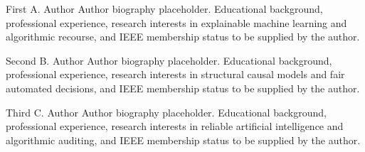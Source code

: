 \documentclass[nolineno]{paper/ieee-access/ieeeaccess}%
\begin{document}
\begin{IEEEbiography}{First A. Author}
Author biography placeholder. Educational background, professional experience, research interests in explainable machine learning and algorithmic recourse, and IEEE membership status to be supplied by the author.
\end{IEEEbiography}

\begin{IEEEbiography}{Second B. Author}
Author biography placeholder. Educational background, professional experience, research interests in structural causal models and fair automated decisions, and IEEE membership status to be supplied by the author.
\end{IEEEbiography}

\begin{IEEEbiography}{Third C. Author}
Author biography placeholder. Educational background, professional experience, research interests in reliable artificial intelligence and algorithmic auditing, and IEEE membership status to be supplied by the author.
\end{IEEEbiography}

\EOD
\end{document}
